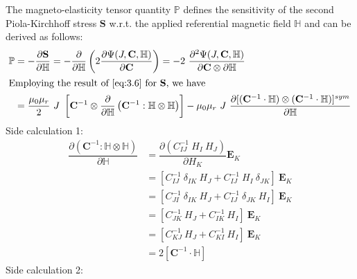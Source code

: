 \documentclass[11pt,a4paper,final]{article}
\begin{document}
The magneto-elasticity tensor quantity $\mathbb{P}$ defines the sensitivity of the second Piola-Kirchhoff stress $\mathbf{S}$ w.r.t. the applied referential magnetic field $\mathbb{H}$ and can be derived as follows:
\begin{align*}
\mathbb{P} &= -\dfrac{\partial \mathbf{S}}{\partial \mathbb{H}} = -\dfrac{\partial}{\partial \mathbb{H}} \left( 2 \dfrac{\partial \Psi (J, \mathbf{C}, \mathbb{H})}{\partial \mathbf{C}} \right) = -2 \ \dfrac{\partial^2 \Psi (J, \mathbf{C}, \mathbb{H})}{\partial \mathbf{C} \otimes \partial \mathbb{H}}\\
\intertext{Employing the result of \Cref{eq:3.6} for $\mathbf{S}$, we have}
&= \dfrac{\mu_0 \mu_r}{2} \ J \ \left[ \mathbf{C}^{-1} \otimes \dfrac{\partial}{\partial \mathbb{H}} \left( \mathbf{C}^{-1} : \mathbb{H} \otimes \mathbb{H} \right) \right] - \mu_0 \mu_r \ J \ \dfrac{\partial [ (\mathbf{C}^{-1} \cdot \mathbb{H}) \otimes (\mathbf{C}^{-1} \cdot \mathbb{H}) ]^{sym}}{\partial \mathbb{H}}
\end{align*}
Side calculation 1:
\begin{align*}
\dfrac{\partial \left( \mathbf{C}^{-1} : \mathbb{H} \otimes \mathbb{H} \right)}{\partial \mathbb{H}} &= \dfrac{\partial \left( C^{-1}_{IJ} \ H_I \ H_J \right)}{\partial H_K} \mathbf{E}_K \\
&= \left[ C^{-1}_{IJ} \ \delta_{IK} \ H_J + C^{-1}_{IJ} \ H_I \ \delta_{JK} \right] \ \mathbf{E}_K \\
&= \left[ C^{-1}_{JI} \ \delta_{IK} \ H_J + C^{-1}_{IJ} \ \delta_{JK} \ H_I \right] \ \mathbf{E}_K \\
&= \left[ C^{-1}_{JK} \ H_J + C^{-1}_{IK} \ H_I \right] \ \mathbf{E}_K \\
&= \left[ C^{-1}_{KJ} \ H_J + C^{-1}_{KI} \ H_I \right] \ \mathbf{E}_K \\
&= 2 [\mathbf{C}^{-1} \cdot \mathbb{H}]
\end{align*}
Side calculation 2:
\end{document}
